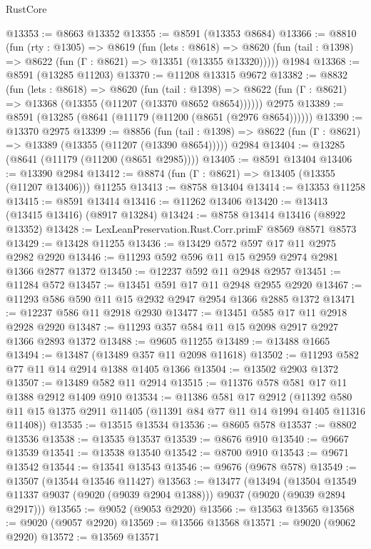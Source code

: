 \begin{lexlean}{RustCore}
\begin{coremodule}
@13353 := @8663 @13352
@13355 := @8591 (@13353 @8684)
@13366 := @8810
    (fun (rty : @1305) =>
    @8619
      (fun (lets : @8618) =>
      @8620 (fun (tail : @1398) => @8622 (fun (Γ : @8621) => @13351 (@13355 @13320)))))
    @1984
@13368 := @8591 (@13285 @11203)
@13370 := @11208 @13315 @9672
@13382 := @8832
    (fun (lets : @8618) =>
    @8620
      (fun (tail : @1398) =>
      @8622 (fun (Γ : @8621) => @13368 (@13355 (@11207 (@13370 @8652 @8654))))))
    @2975
@13389 := @8591 (@13285 (@8641 (@11179 (@11200 (@8651 (@2976 @8654))))))
@13390 := @13370 @2975
@13399 := @8856
    (fun (tail : @1398) => @8622 (fun (Γ : @8621) => @13389 (@13355 (@11207 (@13390 @8654)))))
    @2984
@13404 := @13285 (@8641 (@11179 (@11200 (@8651 @2985))))
@13405 := @8591 @13404
@13406 := @13390 @2984
@13412 := @8874 (fun (Γ : @8621) => @13405 (@13355 (@11207 @13406))) @11255
@13413 := @8758 @13404
@13414 := @13353 @11258
@13415 := @8591 @13414
@13416 := @11262 @13406
@13420 := @13413 (@13415 @13416) (@8917 @13284)
@13424 := @8758 @13414 @13416 (@8922 @13352)
@13428 := LexLeanPreservation.Rust.Corr.primF @8569 @8571 @8573
@13429 := @13428 @11255
@13436 := @13429 @572 @597 @17 @11 @2975 @2982 @2920
@13446 := @11293 @592 @596 @11 @15 @2959 @2974 @2981 @1366 @2877 @1372
@13450 := @12237 @592 @11 @2948 @2957
@13451 := @11284 @572
@13457 := @13451 @591 @17 @11 @2948 @2955 @2920
@13467 := @11293 @586 @590 @11 @15 @2932 @2947 @2954 @1366 @2885 @1372
@13471 := @12237 @586 @11 @2918 @2930
@13477 := @13451 @585 @17 @11 @2918 @2928 @2920
@13487 := @11293 @357 @584 @11 @15 @2098 @2917 @2927 @1366 @2893 @1372
@13488 := @9605 @11255
@13489 := @13488 @1665
@13494 := @13487 (@13489 @357 @11 @2098 @11618)
@13502 := @11293 @582 @77 @11 @14 @2914 @1388 @1405 @1366
@13504 := @13502 @2903 @1372
@13507 := @13489 @582 @11 @2914
@13515 := @11376 @578 @581 @17 @11 @1388 @2912 @1409 @910
@13534 := @11386
    @581
    @17
    @2912
    (@11392 @580 @11 @15 @1375 @2911 @11405 (@11391 @84 @77 @11 @14 @1994 @1405 @11316 @11408))
@13535 := @13515 @13534
@13536 := @8605 @578
@13537 := @8802 @13536
@13538 := @13535 @13537
@13539 := @8676 @910
@13540 := @9667 @13539
@13541 := @13538 @13540
@13542 := @8700 @910
@13543 := @9671 @13542
@13544 := @13541 @13543
@13546 := @9676 (@9678 @578)
@13549 := @13507 (@13544 @13546 @11427)
@13563 := @13477
    (@13494
      (@13504 @13549 @11337 @9037 (@9020 (@9039 @2904 @1388)))
      @9037
      (@9020 (@9039 @2894 @2917)))
@13565 := @9052 (@9053 @2920)
@13566 := @13563 @13565
@13568 := @9020 (@9057 @2920)
@13569 := @13566 @13568
@13571 := @9020 (@9062 @2920)
@13572 := @13569 @13571

\end{coremodule}
\end{lexlean}
